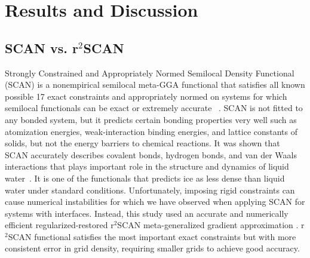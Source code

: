 \chapter{Results and Discussion}

\section{SCAN vs. r$^2$SCAN}
Strongly Constrained and Appropriately Normed Semilocal Density Functional
(SCAN) is  a nonempirical semilocal meta-GGA functional that satisfies all
known possible 17 exact constraints and  appropriately normed on systems for
which semilocal functionals can be exact or extremely accurate
~\cite{sun2015strongly}.  SCAN is not fitted to any bonded system, but it
predicts certain bonding properties very well such as  atomization
energies, weak-interaction binding energies, and lattice
constants of solids, but not the energy barriers to chemical
reactions. It was shown that SCAN accurately describes covalent bonds, hydrogen
bonds, and van der Waals interactions that plays important role in the
structure and dynamics of liquid water~\cite{chen2017ab}. It is one of the
functionals that predicts ice as less dense than liquid water under standard
conditions. Unfortunately,
imposing rigid constraints can cause numerical instabilities for which we have
observed when applying SCAN for systems with interfaces. Instead, this study
used an accurate and numerically efficient regularized-restored r$^2$SCAN
meta-generalized gradient
approximation \cite{Furness2020}. r$^2$SCAN functional satisﬁes the most
important exact constraints but with more consistent error in grid density,
requiring smaller
grids to
achieve good accuracy.

